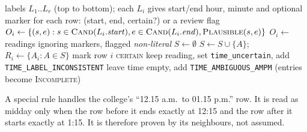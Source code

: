 \begin{algorithm}[H]
\caption{Resolve a column of time labels}\label{alg:time}
\begin{algorithmic}[1]
\Require labels $L_1..L_r$ (top to bottom); each $L_i$ gives start/end hour, minute and optional marker
\Ensure for each row: (start, end, certain?) or a review flag
  \State $O_i \gets \{(s,e) : s \in \textsc{Cand}(L_i.\mathit{start}), e \in \textsc{Cand}(L_i.\mathit{end}), \textsc{Plausible}(s,e)\}$ 
   $O_i \gets$ readings ignoring markers, flagged \textit{non-literal} \EndIf
\EndFor
\State $S \gets \emptyset$
   \Return \EndIf {}
   $S \gets S \cup \{A\}$; \Return \EndIf
     \State {}
  \EndFor
\EndProcedure
\State {}
  \State $R_i \gets \{A_i : A \in S\}$
   mark row $i$ \textsc{certain}
   keep reading, set \texttt{time\_uncertain}, add \texttt{TIME\_LABEL\_INCONSISTENT}
  \Else{} leave time empty, add \texttt{TIME\_AMBIGUOUS\_AMPM} (entries become \textsc{Incomplete})
  \EndIf
\EndFor
\end{algorithmic}
\end{algorithm}
A special rule handles the college's ``12.15 a.m.\ to 01.15 p.m.'' row. It is read as midday only
when the row before it ends exactly at 12:15 and the row after it starts exactly at 1:15. It is
therefore proven by its neighbours, not assumed.

